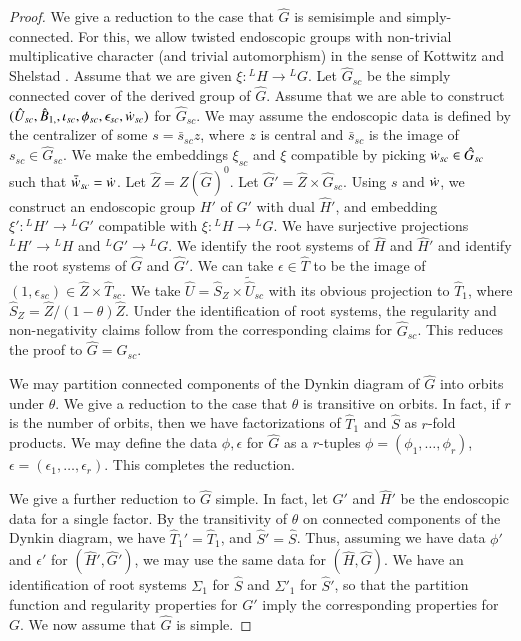 \begin{proof}
  We give a reduction to the case that $\hat G$ is semisimple and
  simply-connected.  For this, we allow twisted endoscopic groups with
  non-trivial multiplicative character (and trivial automorphism) in
  the sense of Kottwitz and Shelstad \cite{kottwitz1999foundations}.
  Assume that we are given $\xi:{}^LH\to {}^LG$.
  Let $\hat G_{sc}$ be the simply connected cover of the derived group
  of $\hat G$.  Assume that we are able to construct $(\hat U_{sc},\hat
  B_{1,\sc},\iota_{sc},\phi_{sc},\epsilon_{sc},\dot w_{sc})$
  for $\hat G_{sc}$.  We
  may assume the endoscopic data is defined by the centralizer of some
  $s = \bar s_{sc} z$, where $z$ is central and $\bar s_{sc}$ is the
  image of $s_{sc}\in \hat G_{sc}$.  We make the embeddings $\xi_{sc}$
  and $\xi$ compatible by picking $\dot w _{sc}\in \hat G_{sc}$ such that
   $\bar {\dot w} _{sc} = \dot w$.  Let $\hat Z = Z(\hat G)^0$.  Let
  $\hat G' = \hat Z\times \hat G_{sc}$.  Using $s$ and $\dot w$, we
  construct an endoscopic group $H'$ of $G'$ with dual $\hat H'$, and
  embedding $\xi':{}^LH' \to {}^LG'$ compatible with $\xi:{}^LH\to {}^LG$.  We
  have surjective projections ${}^LH'\to {}^LH$ and ${}^LG'\to {}^LG$.
  We identify the root systems of $\hat H$ and $\hat H'$ and identify
  the root systems of $\hat G$ and $\hat G'$.  We can take
  $\epsilon\in \hat T$ to be the image of $(1,\epsilon_{sc})\in \hat
  Z\times \hat T_{sc}$.  We take $\hat U = \hat S_Z\times \tilde
  \hat U_{sc}$ with its obvious projection to $\hat T_1$, where $\hat
  S_Z = \hat Z/(1-\theta)\hat Z$.  Under the identification of root
  systems, the regularity and non-negativity claims follow from the
  corresponding claims for $\hat G_{sc}$.  This reduces the proof to
  $\hat G = \hat G_{sc}$.

  We may partition connected components of the Dynkin diagram of $\hat
  G$ into orbits under $\theta$.  We give a reduction to the case that
  $\theta$ is transitive on orbits.  In fact, if $r$ is the number of
  orbits, then we have factorizations of $\hat T_1$ and $\hat S$ as
  $r$-fold products.  We may define the data $\phi,\epsilon$ for $\hat G$ as
  a $r$-tuples $\phi = (\phi_1,\ldots,\phi_r)$, $\epsilon =
  (\epsilon_{1},\ldots,\epsilon_{r})$.  This completes the reduction.

  We give a further reduction to $\hat G$ simple.  In fact, let $\hat
  G'$ and $\hat H'$ be the endoscopic data for a single factor.  By
  the transitivity of $\theta$ on connected components of the Dynkin
  diagram, we have $\hat T_1' = \hat T_1$, and $\hat S' = \hat
  S$.  Thus, assuming we have data $\phi'$ and $\epsilon'$ for
  $(\hat H',\hat G')$, we may use the same data
  for $(\hat H,\hat G)$.  We have
  an identification of root systems $\Sigma_1$ for $\hat S$ and
  $\Sigma'_1$ for $\hat S'$, so that the partition function and
  regularity properties
  for $G'$ imply the corresponding properties for $G$.  We now assume
 that $\hat G$ is simple.


\end{proof}
